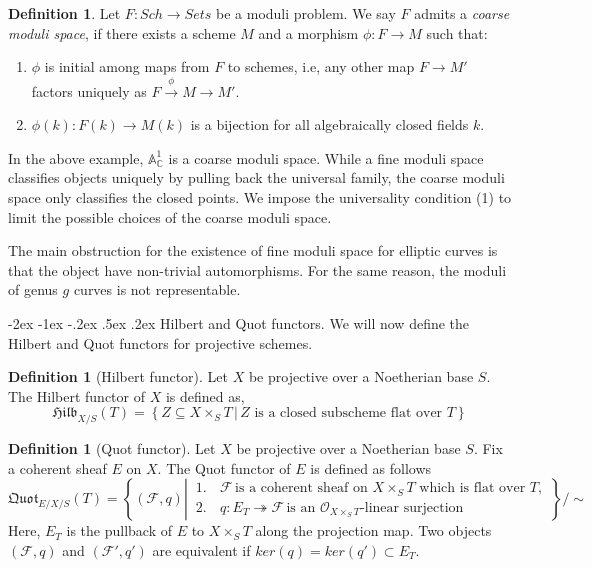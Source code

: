 \documentclass[11pt]{amsart}
\makeatletter
\renewcommand\subsection{\@startsection {subsection}{1}{\z@}%
	{-2ex \@plus -1ex \@minus -.2ex}%
	{.5ex \@plus.2ex}%
	{\normalfont\bfseries}}
\newcommand{\sF}{{\mathcal F}}
\newcommand{\sO}{{\mathcal O}}
\newcommand{\A}{{\mathbb A}}
\newcommand{\C}{{\mathbb C}}
\theoremstyle{definition}
\newtheorem{definition}[theorem]{Definition}
\makeatother
\begin{document}
\begin{definition}
	Let $F: \mathit{Sch}\rightarrow \mathit{Sets}$ be a moduli problem. We say $F$ admits a \textit{coarse moduli space}, if there exists a scheme $M$ and a morphism $\phi: F\rightarrow M$ such that:
	\begin{enumerate}
		\item $\phi$ is initial among maps from $F$ to schemes, i.e, any other map $F\rightarrow M'$ factors uniquely as $F\overset{\phi}{\rightarrow} M \rightarrow M'$.
		\item $\phi(k): F(k)\rightarrow M(k)$ is a bijection for all algebraically closed fields $k$.
	\end{enumerate}
\end{definition}

In the above example, $\A^1_\C$ is a coarse moduli space. While a fine moduli space classifies objects uniquely by pulling back the universal family, the coarse moduli space only classifies the closed points. We impose the universality condition (1) to limit the possible choices of the coarse moduli space.

The main obstruction for the existence of fine moduli space for elliptic curves is that the object have non-trivial automorphisms. For the same reason, the moduli of genus $g$ curves is not representable.

\subsection{Hilbert and Quot functors.}
We will now define the Hilbert and Quot functors for projective schemes. 
\begin{definition}[Hilbert functor]
	Let $X$ be projective over a Noetherian base $S$. The Hilbert functor of $X$ is defined as,
	\begin{equation*}
	\mathfrak{Hilb}_{X/S}(T)=\left\{
	Z \subseteq X\times_S T \,
	\left|\,\text{$Z$ is a closed subscheme flat over $T$}\right.
	\right\}
	\end{equation*}
\end{definition}

\begin{definition}[Quot functor]
	Let $X$ be projective over a Noetherian base $S$. Fix a coherent sheaf $E$ on $X$. The Quot functor of $E$ is defined as follows
	\begin{equation*}
	\mathfrak{Quot}_{E/X/S}(T)=\left\{(\sF,q) \left|\,
	\begin{aligned}
	1.\, &\sF\, \text{is a coherent sheaf on $X\times_S T$ which is flat over $T$}, \\
	2.\, &q: E_T \twoheadrightarrow \sF\, \text{is an $\sO_{X\times_S T}$-linear surjection}
	\end{aligned}
	\right.\right\}\Bigg/\!\sim
	\end{equation*}
	Here, $E_T$ is the pullback of $E$ to $X\times_S T$ along the projection map. Two objects $(\sF,q)$ and $(\sF',q')$ are equivalent if $ker(q)=ker(q')\subset E_T$.
\end{definition}
\end{document}
